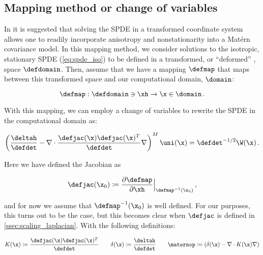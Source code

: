 \documentclass[alpha-refs]{wiley-article}
\begin{document}
\subsection{Mapping method or change of variables}
\label{ssec:mapping_method}

In  it is suggested that solving the SPDE in a transformed
coordinate system allows one to readily incorporate anisotropy and
nonstationarity into a Mat\'ern covariance model.
In this mapping method, we consider solutions to the isotropic, stationary SPDE
(\ref{eq:spde_iso}) to be defined in a transformed, or
``deformed'' \citep{sampson_nonparametric_1992}, space $\defdomain$.
Then, assume that we have a mapping $\defmap$ that maps between this transformed space
and our computational domain, $\domain$:
\begin{linenomath*}\begin{equation*}
    \defmap : \defdomain\ni\xh \rightarrow \x\in\domain \, .
\end{equation*}\end{linenomath*}
With this mapping, we can employ a change of variables
\citep{smith_change_1934} to rewrite the SPDE in the computational domain as:
\begin{linenomath*}\begin{equation*}
    \left(\dfrac{\deltah}{\defdet} -
    \nabla\cdot
    \dfrac{\defjac(\x)\defjac(\x)^T}{\defdet}
    \nabla\right)^M\uni(\x) =
    \defdet^{-1/2}\W(\x) \, .
\end{equation*}\end{linenomath*}
Here we have defined the Jacobian as
\begin{linenomath*}\begin{equation*}
    \defjac(\x_0) \coloneqq
    \dfrac{\partial \defmap}{\partial \xh}\Big|_{\defmap^{-1}(\x_{0})} \, ,
\end{equation*}\end{linenomath*}
and for now we assume that $\defmap^{-1}(\x_0)$ is well defined.
For our purposes, this turns out to be the case, but this becomes clear when
$\defjac$ is defined in \cref{ssec:scaling_laplacian}.
With the following definitions:
\begin{linenomath*}\begin{equation}
        K(\x) \coloneqq
        \dfrac{\defjac(\x)\defjac(\x)^T}{\defdet}
        \qquad
        \delta(\x) \coloneqq \dfrac{\deltah}{\defdet}
        \qquad
        \maternop \coloneqq \left(\delta(\x) - \nabla\cdot K(\x)\nabla\right)
    \label{eq:matern_definitions}
\end{equation}\end{linenomath*}
\end{document}
